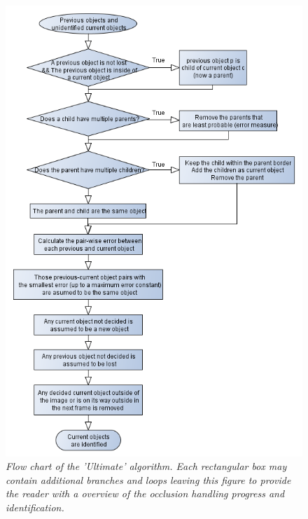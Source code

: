 \newpage
\begin{figure}[h]
	\centering
	\includegraphics[width=123.5mm]{images/data_flow_identification.png}
	\caption{\textit{Flow chart of the 'Ultimate' algorithm. Each rectangular box may contain additional branches and loops leaving this figure to provide the reader with a overview of the occlusion handling progress and identification.}}
	\label{fig:ObjID_fig} %
\end{figure}

